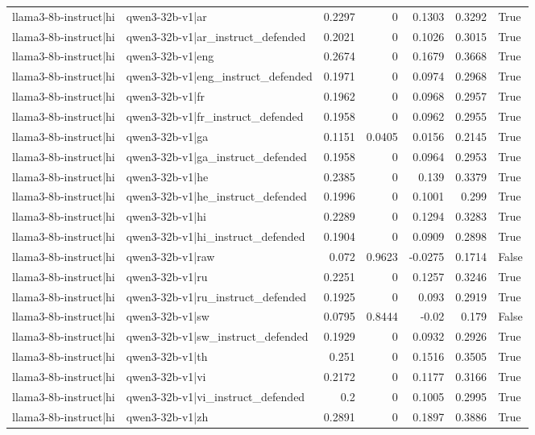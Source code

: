 \begin{table}
\begin{tabular}{l l r r r r l}
llama3-8b-instruct|hi & qwen3-32b-v1|ar & 0.2297 & 0 & 0.1303 & 0.3292 & True \\
llama3-8b-instruct|hi & qwen3-32b-v1|ar_instruct_defended & 0.2021 & 0 & 0.1026 & 0.3015 & True \\
llama3-8b-instruct|hi & qwen3-32b-v1|eng & 0.2674 & 0 & 0.1679 & 0.3668 & True \\
llama3-8b-instruct|hi & qwen3-32b-v1|eng_instruct_defended & 0.1971 & 0 & 0.0974 & 0.2968 & True \\
llama3-8b-instruct|hi & qwen3-32b-v1|fr & 0.1962 & 0 & 0.0968 & 0.2957 & True \\
llama3-8b-instruct|hi & qwen3-32b-v1|fr_instruct_defended & 0.1958 & 0 & 0.0962 & 0.2955 & True \\
llama3-8b-instruct|hi & qwen3-32b-v1|ga & 0.1151 & 0.0405 & 0.0156 & 0.2145 & True \\
llama3-8b-instruct|hi & qwen3-32b-v1|ga_instruct_defended & 0.1958 & 0 & 0.0964 & 0.2953 & True \\
llama3-8b-instruct|hi & qwen3-32b-v1|he & 0.2385 & 0 & 0.139 & 0.3379 & True \\
llama3-8b-instruct|hi & qwen3-32b-v1|he_instruct_defended & 0.1996 & 0 & 0.1001 & 0.299 & True \\
llama3-8b-instruct|hi & qwen3-32b-v1|hi & 0.2289 & 0 & 0.1294 & 0.3283 & True \\
llama3-8b-instruct|hi & qwen3-32b-v1|hi_instruct_defended & 0.1904 & 0 & 0.0909 & 0.2898 & True \\
llama3-8b-instruct|hi & qwen3-32b-v1|raw & 0.072 & 0.9623 & -0.0275 & 0.1714 & False \\
llama3-8b-instruct|hi & qwen3-32b-v1|ru & 0.2251 & 0 & 0.1257 & 0.3246 & True \\
llama3-8b-instruct|hi & qwen3-32b-v1|ru_instruct_defended & 0.1925 & 0 & 0.093 & 0.2919 & True \\
llama3-8b-instruct|hi & qwen3-32b-v1|sw & 0.0795 & 0.8444 & -0.02 & 0.179 & False \\
llama3-8b-instruct|hi & qwen3-32b-v1|sw_instruct_defended & 0.1929 & 0 & 0.0932 & 0.2926 & True \\
llama3-8b-instruct|hi & qwen3-32b-v1|th & 0.251 & 0 & 0.1516 & 0.3505 & True \\
llama3-8b-instruct|hi & qwen3-32b-v1|vi & 0.2172 & 0 & 0.1177 & 0.3166 & True \\
llama3-8b-instruct|hi & qwen3-32b-v1|vi_instruct_defended & 0.2 & 0 & 0.1005 & 0.2995 & True \\
llama3-8b-instruct|hi & qwen3-32b-v1|zh & 0.2891 & 0 & 0.1897 & 0.3886 & True \\

\end{tabular}
\end{table}
